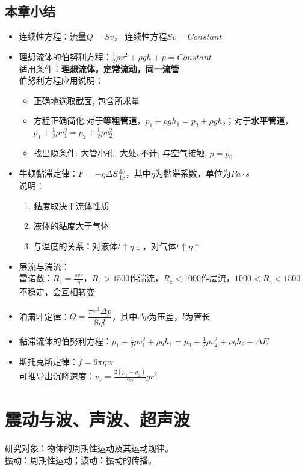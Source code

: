 \documentclass[12pt, a4paper, oneside]{ctexbook}
\begin{document}
\section*{本章小结}
\begin{itemize}
    \item 连续性方程：流量$Q = Sv$， 连续性方程$Sv = Constant$
    \item 理想流体的伯努利方程：$\frac{1}{2} \rho v^2 + \rho gh + p = Constant$\\适用条件：\textbf{理想流体，定常流动，同一流管}\\伯努利方程应用说明：
    \begin{itemize}
        \item 正确地选取截面, 包含所求量
        \item 方程正确简化:对于\textbf{等粗管道}，$p_1 + \rho g h_1 = p_2 + \rho g h_2$；对于\textbf{水平管道}，$p_1 + \frac{1}{2}\rho v_1^2 = p_2 + \frac{1}{2}\rho v_2^2$
        \item 找出隐条件: 大管小孔, 大处$v$不计; 与空气接触, $p  = p_0$
    \end{itemize}
    \item 牛顿黏滞定律：$F = - \eta \Delta S \frac{\mathrm{d}v}{\mathrm{d}x}$，其中$\eta$为黏滞系数，单位为$Pa \cdot s$\\
    说明：\begin{enumerate}
        \item 黏度取决于流体性质
        \item 液体的黏度大于气体
        \item 与温度的关系：对液体$t\uparrow \eta \downarrow$，对气体$t\uparrow \eta \uparrow$
    \end{enumerate}
    \item 层流与湍流：\\雷诺数：$R_e = \frac{\rho v r}{\eta}$，$R_e > 1500$作湍流，$R_e < 1000$作层流，$1000 < R_e < 1500$不稳定，会互相转变
    \item 泊肃叶定律：$Q = \dfrac{\pi r^4 \Delta p}{8\eta l}$，其中$\Delta p$为压差，$l$为管长
    \item 黏滞流体的伯努利方程：$p_1 + \frac{1}{2}\rho v_1^2 + \rho g h_1 = p_2 + \frac{1}{2}\rho v_2^2 + \rho g h_2 + \Delta{E}$
    \item 斯托克斯定律：$f = 6\pi \eta v r$\\可推导出沉降速度：$v_s = \frac{2(\rho_1 - \rho_2)}{9\eta}gr^2$
\end{itemize}



\chapter{震动与波、声波、超声波}
研究对象：物体的周期性运动及其运动规律。\\
振动：周期性运动；波动：振动的传播。
\end{document}
